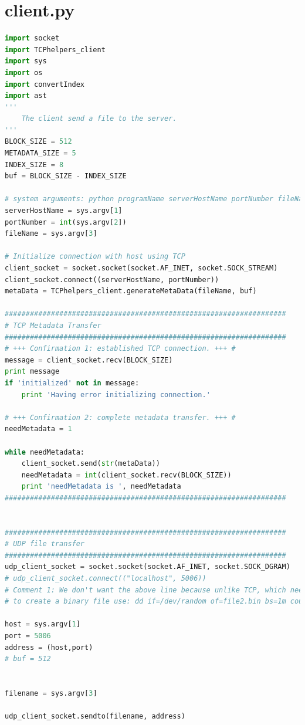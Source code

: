 \documentclass[10pt]{article}
\begin{document}
\section{client.py}
\begin{lstlisting}[language=Python]
import socket
import TCPhelpers_client
import sys
import os
import convertIndex
import ast
'''
    The client send a file to the server.
'''
BLOCK_SIZE = 512
METADATA_SIZE = 5
INDEX_SIZE = 8
buf = BLOCK_SIZE - INDEX_SIZE

# system arguments: python programName serverHostName portNumber fileName
serverHostName = sys.argv[1]
portNumber = int(sys.argv[2])
fileName = sys.argv[3]

# Initialize connection with host using TCP
client_socket = socket.socket(socket.AF_INET, socket.SOCK_STREAM)
client_socket.connect((serverHostName, portNumber))
metaData = TCPhelpers_client.generateMetaData(fileName, buf)

###################################################################
# TCP Metadata Transfer
###################################################################
# +++ Confirmation 1: established TCP connection. +++ #
message = client_socket.recv(BLOCK_SIZE)
print message
if 'initialized' not in message:
    print 'Having error initializing connection.'

# +++ Confirmation 2: complete metadata transfer. +++ #
needMetadata = 1

while needMetadata:
    client_socket.send(str(metaData))
    needMetadata = int(client_socket.recv(BLOCK_SIZE))
    print 'needMetadata is ', needMetadata
###################################################################


###################################################################
# UDP file transfer
###################################################################
udp_client_socket = socket.socket(socket.AF_INET, socket.SOCK_DGRAM)
# udp_client_socket.connect(("localhost", 5006))
# Comment 1: We don't want the above line because unlike TCP, which needs to maintain a solid connection, we don't need to do that with UDP.  UDP is meant to be used as opening a connection and sending stuff over, then closing the connection when done.  Don't need to keep it open
# to create a binary file use: dd if=/dev/random of=file2.bin bs=1m count=200

host = sys.argv[1]
port = 5006
address = (host,port)
# buf = 512


filename = sys.argv[3]

udp_client_socket.sendto(filename, address)


\end{lstlisting}
\end{document}
